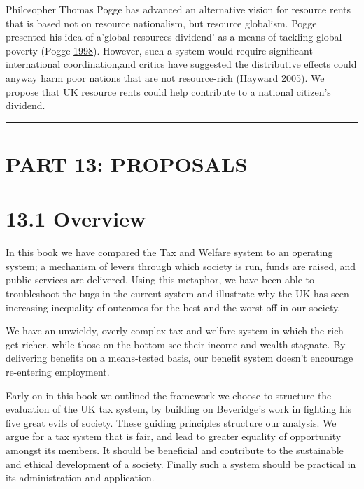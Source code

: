 \documentclass[]{tufte-handout}
\begin{document}
Philosopher Thomas Pogge has advanced an alternative vision for resource
rents that is based not on resource nationalism, but resource globalism.
Pogge presented his idea of a'global resources dividend' as a means of
tackling global poverty (Pogge \protect\hyperlink{ref-Pogge1998}{1998}).
However, such a system would require significant international
coordination,and critics have suggested the distributive effects could
anyway harm poor nations that are not resource-rich (Hayward
\protect\hyperlink{ref-Hayward2005}{2005}). We propose that UK resource
rents could help contribute to a national citizen's dividend.

\begin{center}\rule{0.5\linewidth}{\linethickness}\end{center}

\newpage

\hypertarget{part-13-proposals}{%
\section{PART 13: PROPOSALS}\label{part-13-proposals}}

\hypertarget{overview}{%
\section{13.1 Overview}\label{overview}}

In this book we have compared the Tax and Welfare system to an operating
system; a mechanism of levers through which society is run, funds are
raised, and public services are delivered. Using this metaphor, we have
been able to troubleshoot the bugs in the current system and illustrate
why the UK has seen increasing inequality of outcomes for the best and
the worst off in our society.

We have an unwieldy, overly complex tax and welfare system in which the
rich get richer, while those on the bottom see their income and wealth
stagnate. By delivering benefits on a means-tested basis, our benefit
system doesn't encourage re-entering employment.

Early on in this book we outlined the framework we choose to structure
the evaluation of the UK tax system, by building on Beveridge's work in
fighting his five great evils of society. These guiding principles
structure our analysis. We argue for a tax system that is fair, and lead
to greater equality of opportunity amongst its members. It should be
beneficial and contribute to the sustainable and ethical development of
a society. Finally such a system should be practical in its
administration and application.
\end{document}
